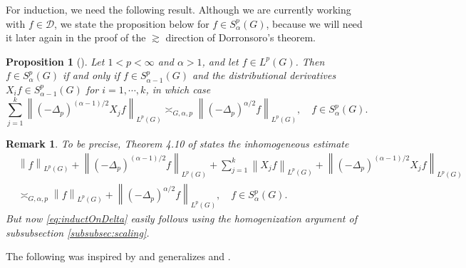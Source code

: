 \documentclass[11pt,reqno]{amsart}
\newtheorem{proposition}[theorem]{Proposition}
\newtheorem{remark}[theorem]{Remark}
\newcommand{\1}{\mathbf 1}
\begin{document}
For induction, we need the following result. Although we are currently working with $f\in \mathcal{D}$, we state the proposition below for $f\in S_\alpha^p\left(G\right)$, because we will need it later again in the proof of the $\gtrsim$ direction of Dorronsoro's theorem.
\begin{proposition}[{\cite[Theorem 4.10]{folland1975subelliptic}}]\label{prop:inductOnDelta}
Let $1<p<\infty$ and $\alpha> 1$, and let $f\in L^p\left(G\right)$. Then $f\in S^p_\alpha\left(G\right)$ if and only if $f\in S^p_{\alpha-1}\left(G\right)$ and the distributional derivatives $X_if\in S^p_{\alpha-1}\left(G\right)$ for $i=1,\cdots,k$, in which case
\begin{equation}\label{eq:inductOnDelta}
\sum_{j=1}^{k} \left\|\left(-\Delta_p\right)^{\left(\alpha-1\right)/2}X_{j}f\right\|_{L^p\left(G\right)} \asymp_{G,\alpha,p} \left\|\left(-\Delta_p\right)^{\alpha/2}f\right\|_{L^p\left(G\right)}, \quad f\in S_\alpha^p\left(G\right).
\end{equation}
\end{proposition}
\begin{remark}
To be precise, Theorem 4.10 of \cite{folland1975subelliptic} states the inhomogeneous estimate
\begin{align*}
&\left\|f\right\|_{L^p\left(G\right)}+\left\|\left(-\Delta_p\right)^{\left(\alpha-1\right)/2}f\right\|_{L^p\left(G\right)}+\sum_{j=1}^{k} \left\|X_jf\right\|_{L^p\left(G\right)}+\left\|\left(-\Delta_p\right)^{\left(\alpha-1\right)/2}X_{j}f\right\|_{L^p\left(G\right)} \\
&\asymp_{G,\alpha,p} \left\|f\right\|_{L^p\left(G\right)}+\left\|\left(-\Delta_p\right)^{\alpha/2}f\right\|_{L^p\left(G\right)}, \quad f\in S_\alpha^p\left(G\right).
\end{align*}
But now \eqref{eq:inductOnDelta} easily follows using the homogenization argument of subsubsection \ref{subsubsec:scaling}.
\end{remark}

The following was inspired by and generalizes \cite[Theorem 5]{dorronsoro1985characterization} and \cite[Proposition 4.2]{fassler2020dorronsoro}.
\end{document}
